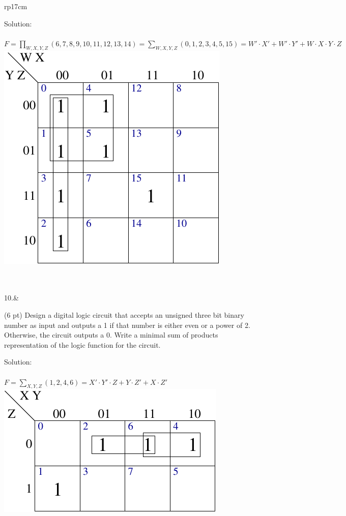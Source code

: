 \documentclass{article}
\begin{document}
\begin{longtable}[l]{rp{17cm}}
\begin{minipage}[t]{\linewidth}
Solution: \\ \\
$F=\prod_{W,X,Y,Z}(6,7,8,9,10,11,12,13,14)=\sum_{W,X,Y,Z}(0,1,2,3,4,5,15)=W' \cdot X' + W' \cdot Y' + W \cdot X \cdot Y \cdot Z$\\
\includegraphics{../CombinationalCircuits/Assessments/4VariableKMapExam}\\ \\
\end{minipage}\\
\medskip
10.&\begin{minipage}[t]{\linewidth}(6 pt) Design a digital logic circuit that accepts an unsigned three bit binary number as input and outputs a 1 if that number is either even or a power of 2.  Otherwise, the circuit outputs a 0.  Write a minimal sum of products representation of the logic function for the circuit.

Solution: \\ \\
$F=\sum_{X,Y,Z}(1,2,4,6)=X' \cdot Y' \cdot Z + Y \cdot Z' + X \cdot Z'$\\
\includegraphics{../CombinationalCircuits/Assessments/CircuitDesignKMapExam}\\
\end{minipage}\\
\medskip
\end{longtable}
\end{document}
